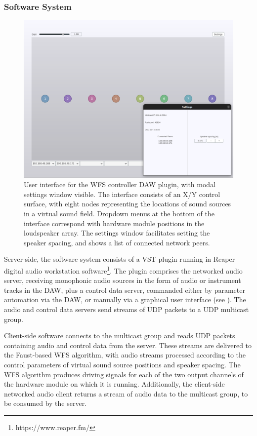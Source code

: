 \subsubsection{Software System}\label{subsubsec:software-system}

\begin{figure}[ht]
    \centering
    \includegraphics[width=\textwidth]{figures/plugin}
    \caption{
        User interface for the WFS controller DAW plugin, with modal
        settings window visible.
        The interface consists of an X/Y control surface, with eight nodes
        representing the locations of sound sources in a virtual sound field.
        Dropdown menus at the bottom of the interface correspond with hardware
        module positions in the loudspeaker array.
        The settings window facilitates setting the speaker spacing, and shows
        a list of connected network peers.
    }
    \label{fig:plugin-interface}
\end{figure}

Server-side, the software system consists of a VST plugin running in Reaper
digital audio workstation software\footnote{
    https://www.reaper.fm/
}.
The plugin comprises the networked audio server, receiving monophonic audio
sources in the form of audio or instrument tracks in the DAW, plus a control
data server, commanded either by parameter automation via the DAW, or manually
via a graphical user interface (see ).
The audio and control data servers send streams of UDP packets to a UDP
multicast group.

Client-side software connects to the multicast group and reads UDP packets
containing audio and control data from the server.
These streams are delivered to the Faust-based WFS algorithm, with audio
streams processed according to the control parameters of virtual sound source
positions and speaker spacing.
The WFS algorithm produces driving signals for each of the two output channels
of the hardware module on which it is running.
Additionally, the client-side networked audio client returns a stream of audio
data to the multicast group, to be consumed by the server.

